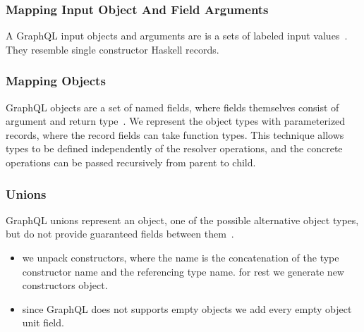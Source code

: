 \begin{frame}\frametitle{Mapping Input Object And Field Arguments}

A GraphQL input objects and arguments are is a sets of labeled input values~\cite{gql-spec}. They resemble single constructor Haskell records. 


\end{frame}
\begin{frame}[allowframebreaks]\frametitle{Mapping Objects}

GraphQL objects are a set of named fields, where fields themselves consist of argument and return type~\cite{gql-spec}. We represent the object types with parameterized records, where the record fields can take function types. This technique allows types to be defined independently of the resolver operations, and the concrete operations can be passed recursively from parent to child. 



\end{frame}

\begin{frame}[allowframebreaks]\frametitle{Unions}

GraphQL unions represent an object, one of the possible alternative object types, but do not provide guaranteed fields between them~\cite{gql-spec}. 


\begin{itemize}
  \item we unpack constructors, where the name is the concatenation of the type constructor name and the referencing type name. for rest we generate new constructors object.
  \item since GraphQL does not supports empty objects we add every empty object unit field.
\end{itemize}


\end{frame}

